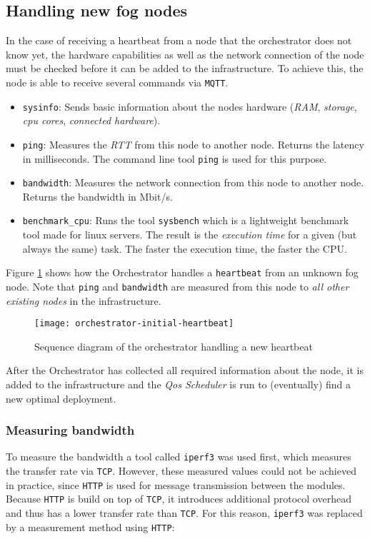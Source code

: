 \subsection*{Handling new fog nodes}

In the case of receiving a heartbeat from a node that the orchestrator does not know yet, the hardware capabilities as well as the network connection of the node must be checked before it can be added to the infrastructure. To achieve this, the node is able to receive several commands via \texttt{MQTT}.

\begin{itemize}
    \item \texttt{sysinfo}: Sends basic information about the nodes hardware (\textit{RAM}, \textit{storage}, \textit{cpu cores}, \textit{connected hardware}).
    \item \texttt{ping}: Measures the \textit{RTT} from this node to another node. Returns the latency in milliseconds. The command line tool \texttt{ping} is used for this purpose.
    \item \texttt{bandwidth}: Measures the network connection from this node to another node. Returns the bandwidth in Mbit/s.
    \item \texttt{benchmark\_cpu}: Runs the tool \texttt{sysbench} which is a lightweight benchmark tool made for linux servers. The result is the \textit{execution time} for a given (but always the same) task. The faster the execution time, the faster the CPU.
\end{itemize}

Figure \ref{fig:orchestrator-initial-heartbeat} shows how the Orchestrator handles a \texttt{heartbeat} from an unknown fog node. Note that \texttt{ping} and \texttt{bandwidth} are measured from this node to \textit{all other existing nodes} in the infrastructure.

\begin{figure}[htb]
    \centering
    \texttt{[image: orchestrator-initial-heartbeat]}
    \caption{Sequence diagram of the orchestrator handling a new heartbeat}
    \label{fig:orchestrator-initial-heartbeat}
\end{figure}

After the Orchestrator has collected all required information about the node, it is added to the infrastructure and the \textit{Qos Scheduler} is run to (eventually) find a new optimal deployment.

\subsubsection*{Measuring bandwidth}
To measure the bandwidth a tool called \texttt{iperf3} was used first, which measures the transfer rate via \texttt{TCP}. However, these measured values could not be achieved in practice, since \texttt{HTTP} is used for message transmission between the modules. Because \texttt{HTTP} is build on top of \texttt{TCP}, it introduces additional protocol overhead and thus has a lower transfer rate than \texttt{TCP}. For this reason, \texttt{iperf3} was replaced by a measurement method using \texttt{HTTP}:

